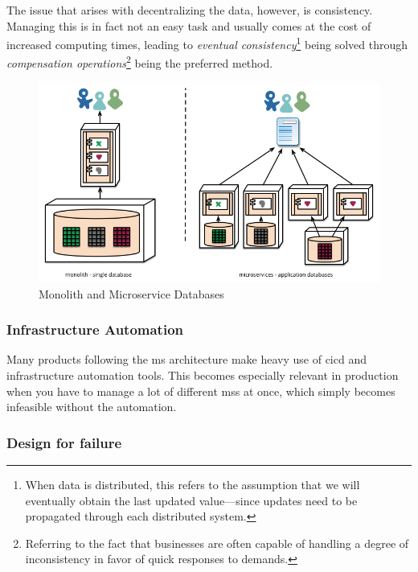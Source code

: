 The issue that arises with decentralizing the data, however, is
consistency.  Managing this is in fact not an easy task and usually
comes at the cost of increased computing times, leading to
\textit{eventual consistency}\footnote{When data is distributed, this
	refers to the assumption that we will eventually obtain the last
	updated value---since updates need to be propagated through each
	distributed system.} being solved through \textit{compensation
operations}\footnote{Referring to the fact that businesses are often
capable of handling a degree of inconsistency in favor of quick
responses to demands.} being the preferred method.
\cite{ms-definition}

\begin{figure}
	\centering
	\includegraphics[width=\linewidth]{images/decentralised-data.png}
	\caption{Monolith and Microservice Databases \cite{ms-definition}}
	\label{fig:databases}
\end{figure}

\subsubsection{Infrastructure Automation}
\label{sec:infrastructure-automation}

Many products following the \gls{ms} architecture make heavy use of
\gls{cicd} and infrastructure automation tools. This becomes
especially relevant in production when you have to manage a lot of
different \glspl{ms} at once, which simply becomes infeasible without
the automation.  \cite{ms-definition}

\subsubsection{Design for failure}
\label{sec:design-for-failure}

